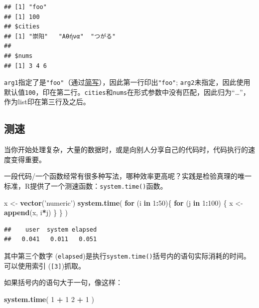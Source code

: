 \documentclass[]{book}
\newenvironment{Shaded}{\begin{snugshade}}{\end{snugshade}}
\newcommand{\ControlFlowTok}[1]{\textcolor[rgb]{0.13,0.29,0.53}{\textbf{#1}}}
\newcommand{\DecValTok}[1]{\textcolor[rgb]{0.00,0.00,0.81}{#1}}
\newcommand{\KeywordTok}[1]{\textcolor[rgb]{0.13,0.29,0.53}{\textbf{#1}}}
\newcommand{\NormalTok}[1]{#1}
\newcommand{\OperatorTok}[1]{\textcolor[rgb]{0.81,0.36,0.00}{\textbf{#1}}}
\newcommand{\StringTok}[1]{\textcolor[rgb]{0.31,0.60,0.02}{#1}}
\begin{document}
\begin{verbatim}
## [1] "foo"
## [1] 100
## $cities
## [1] "崇阳"   "Αθήνα"  "つがる"
## 
## $nums
## [1] 3 4 6
\end{verbatim}

\texttt{arg1}指定了是\texttt{"foo"}（通过\protect\hyperlink{abbr}{简写}），因此第一行印出\texttt{"foo"}; \texttt{arg2}未指定，因此使用默认值\texttt{100}，印在第二行。\texttt{cities}和\texttt{nums}在形式参数中没有匹配，因此归为``\ldots{}''，作为list印在第三行及之后。

\hypertarget{system-time}{%
\subsection{测速}\label{system-time}}

当你开始处理复杂，大量的数据时，或是向别人分享自己的代码时，代码执行的速度变得重要。

一段代码/一个函数经常有很多种写法，哪种效率更高呢？实践是检验真理的唯一标准，R提供了一个测速函数：\texttt{system.time()}函数。

\begin{Shaded}
\begin{Highlighting}[]
\NormalTok{x <-}\StringTok{ }\KeywordTok{vector}\NormalTok{(}\StringTok{'numeric'}\NormalTok{)}
\KeywordTok{system.time}\NormalTok{(}
  \ControlFlowTok{for}\NormalTok{ (i }\ControlFlowTok{in} \DecValTok{1}\OperatorTok{:}\DecValTok{50}\NormalTok{)\{}
    \ControlFlowTok{for}\NormalTok{ (j }\ControlFlowTok{in} \DecValTok{1}\OperatorTok{:}\DecValTok{100}\NormalTok{) \{}
\NormalTok{      x <-}\StringTok{ }\KeywordTok{append}\NormalTok{(x, i}\OperatorTok{*}\NormalTok{j)}
\NormalTok{    \}}
\NormalTok{  \}}
\NormalTok{)}
\end{Highlighting}
\end{Shaded}

\begin{verbatim}
##    user  system elapsed 
##   0.041   0.011   0.051
\end{verbatim}

其中第三个数字 (\texttt{elapsed})是执行\texttt{system.time()}括号内的语句实际消耗的时间。可以使用索引 (\texttt{{[}3{]}})抓取。

如果括号内的语句大于一句，像这样：

\begin{Shaded}
\begin{Highlighting}[]
\KeywordTok{system.time}\NormalTok{(}
  \DecValTok{1} \OperatorTok{+}\StringTok{ }\DecValTok{1}
  \DecValTok{2} \OperatorTok{+}\StringTok{ }\DecValTok{1}
\NormalTok{)}
\end{Highlighting}
\end{Shaded}
\end{document}
